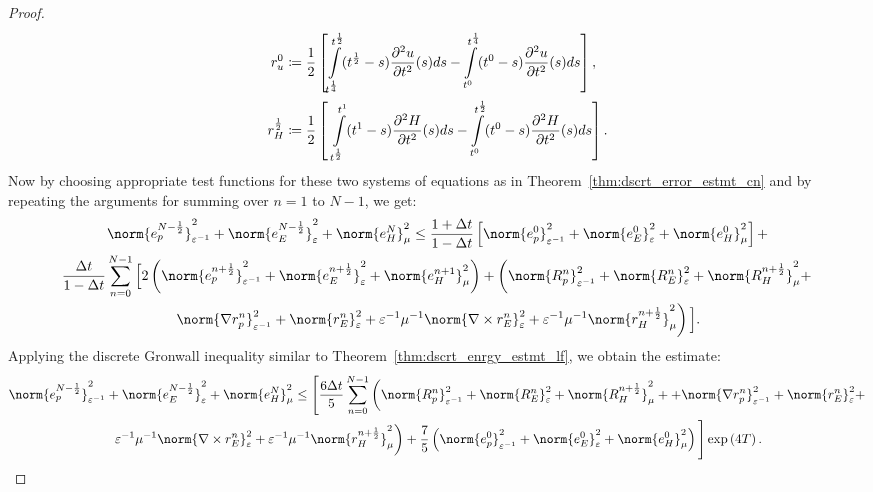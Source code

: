 \documentclass{amsart}
\theoremstyle{thmstyleone}%
\theoremstyle{thmstyletwo}%
\theoremstyle{thmstylethree}%
\begin{document}
\begin{proof}
\begin{align*}
r_u^0 & \coloneqq \dfrac{1}{2} \left[\int\limits_{\mathclap{t^\frac{1}{4}}}^{t^{ \frac{1}{2}}} (t^{ \frac{1}{2}} - s) \dfrac{\partial^2 u}{\partial t^2}(s) ds - \int\limits_{t^0}^{t^\frac{1}{4}} (t^0 - s) \dfrac{\partial^2 u}{\partial t^2}(s) ds\right], \\
r_H^{ \frac{1}{2}} & \coloneqq \dfrac{1}{2} \left[\,\, \int\limits_{\mathclap{t^{\frac{1}{2}}}}^{t^{1}} (t^{1} - s) \dfrac{\partial^2 H}{\partial t^2}(s) ds - \int\limits_{t^0}^{t^{\frac{1}{2}}} (t^0 - s) \dfrac{\partial^2 H}{\partial t^2}(s) ds\right].
\end{align*}
Now by choosing appropriate test functions for these two systems of equations as in Theorem~\ref{thm:dscrt_error_estmt_cn} and by repeating the arguments for summing over $n = 1$ to $N - 1$, we get: 
\begin{multline*}
  \norm{e_p^{N - \frac{1}{2}}}^2_{\varepsilon^{-1}} + \norm{e_E^{N - \frac{1}{2}}}^2_{\varepsilon} + \norm{e_H^N}^2_{\mu} \le \dfrac{1 + \Delta t}{1 - \Delta t} \left[ \norm{e_p^0}^2_{\varepsilon^{-1}} + \norm{e_E^0}^2_{\varepsilon} + \norm{e_H^0}^2_{\mu} \right] + \\
  \dfrac{\Delta t}{1 - \Delta t} \sum\limits_{n = 0}^{N - 1} \Big[ 2 \left( \norm{e_p^{n + \frac{1}{2}}}^2_{\varepsilon^{-1}} + \norm{e_E^{n + \frac{1}{2}}}^2_{\varepsilon} + \norm{e_H^{n + 1}}^2_{\mu} \right) + \left( \norm{R_p^n}^2_{\varepsilon^{-1}} + \norm{R_E^n}^2_{\varepsilon} + \norm{R_H^{n + \frac{1}{2}}}^2_{\mu} + \right. \\ 
\left. \norm{\nabla r_p^n} ^2_{\varepsilon^{-1}} + \norm{r_E^n}^2_{\varepsilon} + \varepsilon^{-1} \mu^{-1} \norm{\nabla \times r_E^n}^2_{\varepsilon} +  \varepsilon^{-1} \mu^{-1} \norm{r_H^{n + \frac{1}{2}}}^2_{\mu} \right) \Big].
\end{multline*}
Applying the discrete Gronwall inequality similar to Theorem~\ref{thm:dscrt_enrgy_estmt_lf}, we obtain the estimate:
\begin{multline*}
  \norm{e_p^{N - \frac{1}{2}}}^2_{\varepsilon^{-1}} + \norm{e_E^{N - \frac{1}{2}}}^2_{\varepsilon} +\norm{e_H^N}^2_{\mu} \le \Bigg[ \dfrac{6 \Delta t}{5} \sum\limits_{n = 0}^{N - 1} \left(\norm{R_p^n}^2_{\varepsilon^{-1}} + \norm{R_E^n}^2_{\varepsilon} + \norm{R_H^{n + \frac{1}{2}}}^2_{\mu} + + \norm{\nabla r_p^n} ^2_{\varepsilon^{-1}} + \norm{r_E^n}^2_{\varepsilon} + \right. \\ 
\left. \varepsilon^{-1} \mu^{-1} \norm{\nabla \times r_E^n}^2_{\varepsilon} +  \varepsilon^{-1} \mu^{-1} \norm{r_H^{n + \frac{1}{2}}}^2_{\mu} \right) +
  \dfrac{7}{5} \left(\norm{e_p^0}^2_{\varepsilon^{-1}} + \norm{e_E^0}^2_{\varepsilon}  + \norm{e_H^0}^2_\mu \right)\Bigg] \exp\left( 4 T \right).

\end{multline*}
\end{proof}
\end{document}
